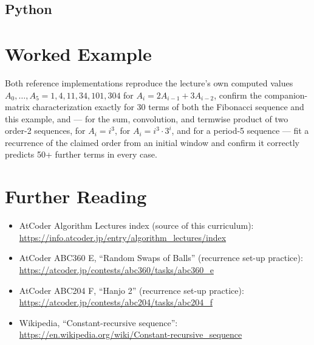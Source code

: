 \documentclass[11pt]{article}
\begin{document}
\subsection{Python}

\section{Worked Example}
\begin{examplebox}
Both reference implementations reproduce the lecture's own computed
values $A_0,\ldots,A_5=1,4,11,34,101,304$ for $A_i=2A_{i-1}+3A_{i-2}$,
confirm the companion-matrix characterization exactly for 30 terms of
both the Fibonacci sequence and this example, and --- for the sum,
convolution, and termwise product of two order-2 sequences, for
$A_i=i^3$, for $A_i=i^3\cdot 3^i$, and for a period-5 sequence --- fit a
recurrence of the claimed order from an initial window and confirm it
correctly predicts 50+ further terms in every case.
\end{examplebox}

\section{Further Reading}
\begin{itemize}[leftmargin=1.5em]
  \item AtCoder Algorithm Lectures index (source of this curriculum):
        \url{https://info.atcoder.jp/entry/algorithm_lectures/index}
  \item AtCoder ABC360 E, ``Random Swaps of Balls'' (recurrence
        set-up practice):
        \url{https://atcoder.jp/contests/abc360/tasks/abc360_e}
  \item AtCoder ABC204 F, ``Hanjo 2'' (recurrence set-up practice):
        \url{https://atcoder.jp/contests/abc204/tasks/abc204_f}
  \item Wikipedia, ``Constant-recursive sequence'':
        \url{https://en.wikipedia.org/wiki/Constant-recursive_sequence}
\end{itemize}
\end{document}
